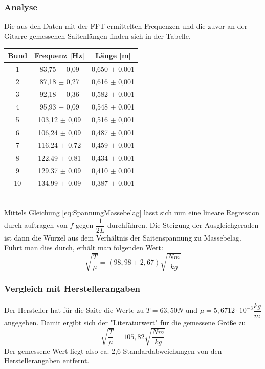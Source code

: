 \documentclass[12pt,a4paper]{article}
\begin{document}
\subsubsection{Analyse}
Die aus den Daten mit der FFT ermittelten Frequenzen und die zuvor an der Gitarre gemessenen Saitenlängen finden sich in der Tabelle. \\
\begin{tabular}{|c|c|c|}
\hline 
Bund & Frequenz [Hz] & Länge [m] \\ 
\hline 
1 & 83,75 $\pm$ 0,09 & 0,650 $\pm$ 0,001 \\ 
\hline 
2 & 87,18 $\pm$ 0,27 & 0,616 $\pm$ 0,001 \\ 
\hline 
3 & 92,18 $\pm$ 0,36 & 0,582 $\pm$ 0,001 \\ 
\hline 
4 & 95,93 $\pm$ 0,09 & 0,548 $\pm$ 0,001 \\ 
\hline 
5 & 103,12 $\pm$ 0,09 & 0,516 $\pm$ 0,001 \\ 
\hline 
6 & 106,24 $\pm$ 0,09 & 0,487 $\pm$ 0,001 \\ 
\hline 
7 & 116,24 $\pm$ 0,72 & 0,459 $\pm$ 0,001 \\ 
\hline 
8 & 122,49 $\pm$ 0,81 & 0,434 $\pm$ 0,001 \\ 
\hline 
9 & 129,37 $\pm$ 0,09 & 0,410 $\pm$ 0,001 \\ 
\hline 
10 & 134,99 $\pm$ 0,09 & 0,387 $\pm$ 0,001 \\ 
\hline 
\end{tabular} 
\\Mittels Gleichung \ref{eq:SpannungMassebelag} lässt sich nun eine lineare Regression durch auftragen von $f$ gegen $\dfrac{1}{2L}$ durchführen. Die Steigung der Ausgleichgeraden ist dann die Wurzel aus dem Verhältnis der Saitenspannung zu Massebelag. \\
Führt man dies durch, erhält man folgenden Wert:
\begin{equation}
\sqrt{\dfrac{T}{\mu}} = (98,98 \pm 2,67)\sqrt{\dfrac{Nm}{kg}}
\end{equation}
\subsubsection{Vergleich mit Herstellerangaben}
Der Hersteller hat für die Saite die Werte zu $T = 63,50N$ und $\mu = 5,6712 \cdot 10^{-3} \dfrac{kg}{m}$ angegeben. Damit ergibt sich der "Literaturwert" für die gemessene Größe zu 
\begin{equation}
\sqrt{\dfrac{T}{\mu}} = 105,82 \sqrt{\dfrac{Nm}{kg}}
\end{equation}
Der gemessene Wert liegt also ca. 2,6 Standardabweichungen von den Herstellerangaben entfernt.
\end{document}
